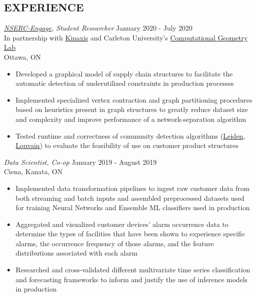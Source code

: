 \documentclass[margin]{res}
\begin{document}
\begin{resume}
\section{EXPERIENCE} 
{\sl \href{https://www.nserc-crsng.gc.ca/Professors-Professeurs/RPP-PP/Engage-engagement_eng.asp}{NSERC-Engage}, Student Researcher} \hfill January 2020 - July 2020 \\
In partnership with \href{https://www.kinaxis.com/en}{Kinaxis} and Carleton University's \href{https://cglab.ca/}{Computational Geometry Lab}\\
Ottawa, ON
\begin{itemize}  \itemsep -2pt
      \item{Developed a graphical model of supply chain structures to facilitate the automatic detection of underutilized constraints in production processes}
      \item{Implemented specialized vertex contraction and graph partitioning procedures based on heuristics present in graph structures to greatly reduce dataset size and complexity and improve performance of a network-separation algorithm}
      \item{Tested runtime and correctness of community detection algorithms (\href{https://www.nature.com/articles/s41598-019-41695-z.pdf}{Leiden}, \href{https://arxiv.org/pdf/0803.0476.pdf}{Louvain}) to evaluate the feasibility of use on customer product structures}
\end{itemize}
{\sl Data Scientist, Co-op} \hfill January 2019 - August 2019 \\
Ciena, Kanata, ON
\begin{itemize}  \itemsep -2pt %
\item Implemented data transformation pipelines to ingest raw
      customer data from both streaming and batch inputs and 
      assembled preprocessed datasets used for training Neural Networks
      and Ensemble ML classifiers used in production
\item Aggregated and visualized customer devices' alarm occurrence data
      to determine the types
      of facilities that have been shown to experience specific alarms,
      the occurrence frequency of those alarms, and the feature distributions associated with each alarm
\item Researched and cross-validated different multivariate time series classification and forecasting frameworks to inform and justify the use of inference models in production
\end{itemize}


\end{resume}
\end{document}
